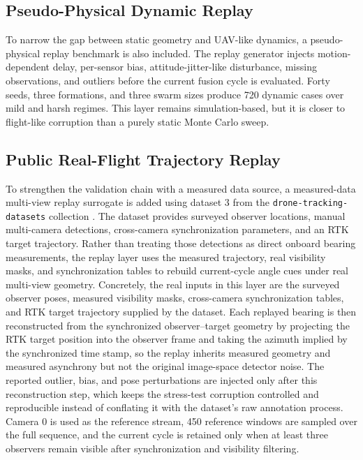 \documentclass[drones,article,submit,pdftex,moreauthors]{Definitions/mdpi}
\begin{document}
\subsection{Pseudo-Physical Dynamic Replay}

To narrow the gap between static geometry and UAV-like dynamics, a pseudo-physical replay benchmark is also included. The replay generator injects motion-dependent delay, per-sensor bias, attitude-jitter-like disturbance, missing observations, and outliers before the current fusion cycle is evaluated. Forty seeds, three formations, and three swarm sizes produce 720 dynamic cases over mild and harsh regimes. This layer remains simulation-based, but it is closer to flight-like corruption than a purely static Monte Carlo sweep.

\subsection{Public Real-Flight Trajectory Replay}

To strengthen the validation chain with a measured data source, a measured-data multi-view replay surrogate is added using dataset 3 from the \texttt{drone-tracking-datasets} collection \cite{albl2020reconstruction}. The dataset provides surveyed observer locations, manual multi-camera detections, cross-camera synchronization parameters, and an RTK target trajectory. Rather than treating those detections as direct onboard bearing measurements, the replay layer uses the measured trajectory, real visibility masks, and synchronization tables to rebuild current-cycle angle cues under real multi-view geometry. Concretely, the real inputs in this layer are the surveyed observer poses, measured visibility masks, cross-camera synchronization tables, and RTK target trajectory supplied by the dataset. Each replayed bearing is then reconstructed from the synchronized observer--target geometry by projecting the RTK target position into the observer frame and taking the azimuth implied by the synchronized time stamp, so the replay inherits measured geometry and measured asynchrony but not the original image-space detector noise. The reported outlier, bias, and pose perturbations are injected only after this reconstruction step, which keeps the stress-test corruption controlled and reproducible instead of conflating it with the dataset's raw annotation process. Camera 0 is used as the reference stream, 450 reference windows are sampled over the full sequence, and the current cycle is retained only when at least three observers remain visible after synchronization and visibility filtering.
\end{document}
